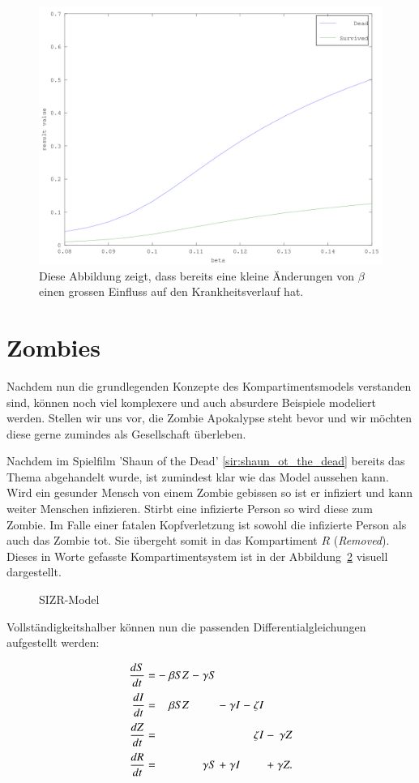 \begin{refsection}
\begin{figure}[p]
	\centering
	\includegraphics[width=.7\textwidth]{sir/images/beta_change_det}
  \caption[Einfluss von $\beta$ auf die Mortalitätsrate]{Diese Abbildung zeigt, dass bereits eine kleine Änderungen von $\beta$ einen grossen Einfluss auf den Krankheitsverlauf hat.}
  \label{fig:beta_change_det}
\end{figure}

\section{Zombies}
Nachdem nun die grundlegenden Konzepte des Kompartimentsmodels verstanden sind, können noch viel komplexere und auch absurdere Beispiele modeliert werden. Stellen wir uns vor, die Zombie Apokalypse steht bevor und wir möchten diese gerne zumindes als Gesellschaft überleben. 

Nachdem im Spielfilm 'Shaun of the Dead' \ref{sir:shaun_ot_the_dead} bereits das Thema abgehandelt wurde, ist zumindest klar wie das Model aussehen kann. Wird ein gesunder Mensch von einem Zombie gebissen so ist er infiziert und kann weiter Menschen infizieren. Stirbt eine infizierte Person so wird diese zum Zombie. Im Falle einer fatalen Kopfverletzung ist sowohl die infizierte Person als auch das Zombie tot. Sie übergeht somit in das Kompartiment $R$ (\emph{Removed}). Dieses in Worte gefasste Kompartimentsystem ist in der Abbildung~\ref{fig:zombie_non_healing} visuell dargestellt.
%
\begin{figure}
  \centering
  
  \caption{SIZR-Model}
  \label{fig:zombie_non_healing}
\end{figure}
Vollständigkeitshalber können nun die passenden Differentialgleichungen aufgestellt werden:
\[
\arraycolsep=1.4pt\def\arraystretch{2.2}
  \begin{array}{rccrcrcrcrcr}
   \displaystyle\frac{dS}{dt} & = &-& \beta S Z  &-&  \gamma S & &         & & & & \\
   \displaystyle\frac{dI}{dt} & = & & \beta S Z  & &           &-&\gamma I &-& \zeta I  & & \\
   \displaystyle\frac{dZ}{dt} & = & &            & &           & &         & & \zeta I  &-& \gamma Z \\   
   \displaystyle\frac{dR}{dt} & = & &            & &  \gamma S &+&\gamma I & &          &+& \gamma Z.
 \end{array}
\]


\end{refsection}
